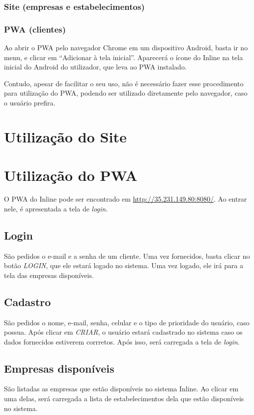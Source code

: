 \documentclass{book}
\begin{document}
\subsection{Site (empresas e estabelecimentos)}
\subsection{PWA (clientes)}
Ao abrir o PWA pelo navegador Chrome em um dispositivo Android, basta ir no
menu, e clicar em ``Adicionar à tela inicial''. Aparecerá o ícone do Inline
na tela inicial do Android do utilizador, que leva ao PWA instalado.

Contudo, apesar de facilitar o seu uso, não é necessário fazer esse procedimento
para utilização do PWA, podendo ser utilizado diretamente pelo navegador, caso o
usuário prefira.

\chapter{Utilização do Site}

\chapter{Utilização do PWA}

O PWA do Inline pode ser encontrado em \url{http://35.231.149.80:8080/}. Ao
entrar nele, é apresentada a tela de \textit{login}. 

\section{Login}

São pedidos o e-mail e a senha de um cliente. Uma vez fornecidos, basta clicar
no botão \textit{LOGIN}, que ele estará logado no sistema. Uma vez logado, ele
irá para a tela das empresas disponíveis.

\section{Cadastro}
São pedidos o nome, e-mail, senha, celular e o tipo de prioridade do usuário,
caso possua. Após clicar em \textit{CRIAR}, o usuário estará cadastrado no
sistema caso os dados fornecidos estiverem corrretos. Após isso, será carregada
a tela de \textit{login}.

\section{Empresas disponíveis}
São listadas as empresas que estão disponíveis no sistema Inline. Ao clicar em
uma delas, será carregada a lista de estabelecimentos dela que estão disponíveis
no sistema.
\end{document}
